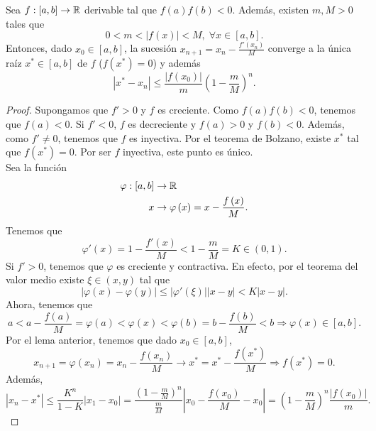 \begin{ftheorem}[]
	\normalfont Sea $\displaystyle f: \left[a,b\right] \to \mathbb{R} $ derivable tal que $\displaystyle f\left(a\right)f\left(b\right) < 0 $. Además, existen $\displaystyle m,M > 0 $ tales que 
	\[ 0 < m < \left|f\left(x\right)\right| < M , \; \forall x \in \left[a,b\right]  .\]
	Entonces, dado $\displaystyle x_{0} \in \left[a,b\right]  $, la sucesión $\displaystyle x_{n+1} = x_{n}-\frac{f'\left(x_{n}\right)}{M} $ converge a la única raíz $\displaystyle x^{*} \in \left[a,b\right]  $ de $\displaystyle f $ ($\displaystyle f\left(x^{*}\right) = 0 $) y además
	\[ \left|x^{*}-x_{n}\right| \leq \frac{ \left|f\left(x_{0}\right)\right|}{m}\left(1-\frac{m}{M}\right)^{n} .\]
\end{ftheorem}
\begin{proof}
Supongamos que $\displaystyle f' > 0 $ y $\displaystyle f $ es creciente. Como $\displaystyle f\left(a\right)f\left(b\right) < 0 $, tenemos que $\displaystyle f\left(a\right) < 0 $. Si $\displaystyle f' < 0 $, $\displaystyle f $ es decreciente y $\displaystyle f\left(a\right) > 0 $ y $\displaystyle f\left(b\right) < 0 $. Además, como $\displaystyle f' \neq 0 $, tenemos que $\displaystyle f $ es inyectiva. Por el teorema de Bolzano, existe $\displaystyle x^{*} $ tal que $\displaystyle f\left(x^{*}\right) = 0 $. Por ser $\displaystyle f $ inyectiva, este punto es único.\\ 
Sea la función 
\[
\begin{split}
	\varphi : \left[a,b\right] & \to \mathbb{R}\\
	x & \to \varphi\left(x\right) = x - \frac{f\left(x\right)}{M}.
\end{split}
\]
Tenemos que 
\[\varphi'\left(x\right) = 1 - \frac{f'\left(x\right)}{M} < 1 - \frac{m}{M} = K \in \left(0,1\right) .\]
Si $\displaystyle f' > 0 $, tenemos que $\displaystyle \varphi $ es creciente y contractiva. En efecto, por el teorema del valor medio existe $\displaystyle \xi \in \left(x,y\right) $ tal que
\[ \left|\varphi\left(x\right)-\varphi\left(y\right)\right| \leq \left|\varphi'\left(\xi\right)\right| \left|x-y\right| < K \left|x-y\right|.\]
Ahora, tenemos que 
\[a < a - \frac{f\left(a\right)}{M} = \varphi\left(a\right) < \varphi\left(x\right) < \varphi\left(b\right) = b - \frac{f\left(b\right)}{M} < b \Rightarrow \varphi\left(x\right) \in \left[a,b\right]  .\]
Por el lema anterior, tenemos que dado $\displaystyle x_{0} \in \left[a,b\right]  $,
\[x_{n+1} = \varphi\left(x_{n}\right) = x_{n}-\frac{f\left(x_{n}\right)}{M} \to x^{*} = x^{*} - \frac{f\left(x^{*}\right)}{M} \Rightarrow f\left(x^{*}\right) = 0.\]
Además, 
\[ \left|x_{n}-x^{*}\right| \leq \frac{K^{n}}{1-K} \left|x_{1}-x_{0}\right| = \frac{\left(1-\frac{m}{M}\right)^{n}}{\frac{m}{M}} \left|x_{0}-\frac{f\left(x_{0}\right)}{M}-x_{0}\right| = \left(1-\frac{m}{M}\right)^{n}\frac{ \left|f\left(x_{0}\right)\right|}{m} .\]
\end{proof}


